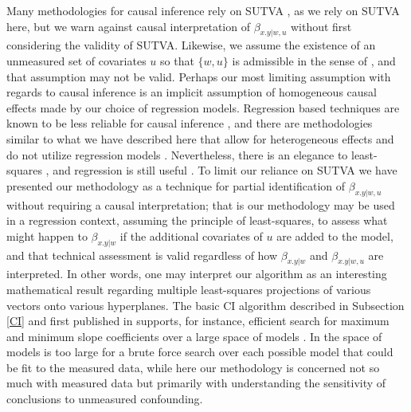 \documentclass[11pt]{amsart}
\begin{document}
Many methodologies for causal inference rely on SUTVA \citep{Imbens2015}, as we rely on SUTVA here, but we warn against causal interpretation of $\beta_{x.y|w,u}$ without first considering the validity of SUTVA. Likewise, we assume the existence of an unmeasured set of covariates $u$ so that $\{w,u\}$ is admissible in the sense of \citep{Pearl2009}, and that assumption may not be valid. Perhaps our most limiting assumption with regards to causal inference is an implicit assumption of homogeneous causal effects made by our choice of regression models. Regression based techniques are known to be less reliable for causal inference \citep{Rose10}, and there are methodologies similar to what we have described here that allow for heterogeneous effects and do not utilize regression models \citep{Knaeble2023, Knaeble2024, 10.48550/arxiv.2407.19057}. Nevertheless, there is an elegance to least-squares \citep{KD, Knaeble2020}, and regression is still useful \citep{Angrist2009}. To limit our reliance on SUTVA we have presented our methodology as a technique for partial identification of $\beta_{x.y|w,u}$ without requiring a causal interpretation; that is our methodology may be used in a regression context, assuming the principle of least-squares, to assess what might happen to $\beta_{x.y|w}$ if the additional covariates of $u$ are added to the model, and that technical assessment is valid regardless of how $\beta_{x.y|w}$ and $\beta_{x.y|w,u}$ are interpreted. In other words, one may interpret our algorithm as an interesting mathematical result regarding multiple least-squares projections of various vectors onto various hyperplanes. The basic CI algorithm described in Subsection \ref{CI} and first published in \citep{Knaeble2020} supports, for instance, efficient search for maximum and minimum slope coefficients over a large space of models \citep{KBB}. In \citep{KBB} the space of models is too large for a brute force search over each possible model that could be fit to the measured data, while here our methodology is concerned not so much with measured data but primarily with understanding the sensitivity of conclusions to unmeasured confounding.
\end{document}
